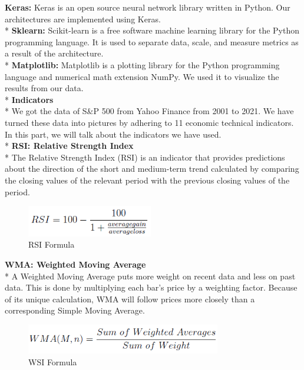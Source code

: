 \documentclass{article}
\begin{document}
\textbf{Keras:} Keras is an open source neural network library written in Python. Our architectures are implemented using Keras.\vspace{0.1cm}\\*
\textbf{Sklearn:} Scikit-learn is a free software machine learning library for the Python programming language. It is used to separate data, scale, and measure metrics as a result of the architecture.\vspace{0.1cm}\\*
\textbf{Matplotlib:} Matplotlib is a plotting library for the Python programming language and numerical math extension NumPy. We used it to visualize the results from our data.\vspace{0.5cm}\\*
\textbf{\large Indicators} \vspace{0.1cm}\\*
We got the data of S\&P 500 from Yahoo Finance from 2001 to 2021. We have turned these data into pictures by adhering to 11 economic technical indicators. In this part, we will talk about the indicators we have used.\vspace{0.3cm}\\*
\textbf{RSI: Relative Strength Index}\\*
The Relative Strength Index (RSI) is an indicator that provides predictions about the direction of the short and medium-term trend calculated by comparing the closing values of the relevant period with the previous closing values of the period.
\begin{figure}[H]
\begin{center}
   \includegraphics[width=55mm,scale=0.5]{assets/formulas/rsi.png}
   \caption{RSI Formula}
\end{center}
\end{figure}
\noindent
\textbf{WMA: Weighted Moving Average} \\*
A Weighted Moving Average puts more weight on recent data and less on past data. This is done by multiplying each bar’s price by a weighting factor. Because of its unique calculation, WMA will follow prices more closely than a corresponding Simple Moving Average.
\begin{figure}[H]
\begin{center}
   \includegraphics[width=85mm,scale=0.8]{assets/formulas/wma.png}
   \caption{WSI Formula}
\end{center}
\end{figure}
\end{document}
